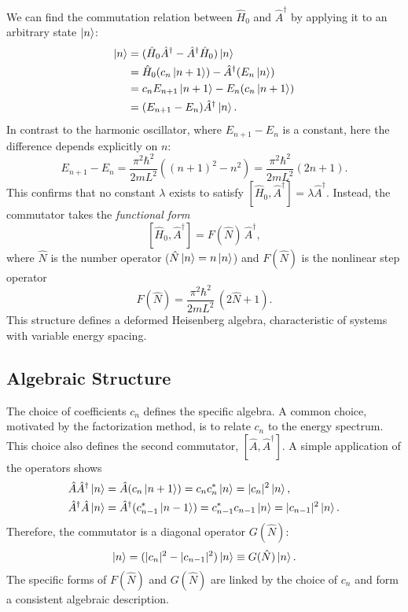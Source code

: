 We can find the commutation relation between $\hat{H}_0$ and
$\hat{A}^\dagger$ by applying it to an arbitrary state $\ket{n}$:
\begin{align}
  [\hat{H}_0, \hat{A}^\dagger] \ket{n}
    &= (\hat{H}_0 \hat{A}^\dagger - \hat{A}^\dagger \hat{H}_0) \ket{n}
      \nonumber \\
    &= \hat{H}_0 (c_n \ket{n+1}) - \hat{A}^\dagger (E_n \ket{n})
      \nonumber \\
    &= c_n E_{n+1} \ket{n+1} - E_n (c_n \ket{n+1}) \nonumber \\
    &= (E_{n+1} - E_n) \hat{A}^\dagger \ket{n}.
\end{align}
In contrast to the harmonic oscillator, where $E_{n+1} - E_n$ is a
constant, here the difference depends explicitly on $n$:
\begin{equation}
  E_{n+1} - E_n = \frac{\pi^2\hbar^2}{2mL^2} \left( (n+1)^2 - n^2 \right)
  = \frac{\pi^2\hbar^2}{2mL^2}(2n+1).
\end{equation}
This confirms that no constant $\lambda$ exists to satisfy
$[\hat{H}_0,\hat{A}^\dagger] = \lambda \hat{A}^\dagger$.
Instead, the commutator takes the \emph{functional form}
\begin{equation} \label{eq:deformed_comm_H}
  [\hat{H}_0,\hat{A}^\dagger] = F(\hat{N})\,\hat{A}^\dagger,
\end{equation}
where $\hat{N}$ is the number operator ($\hat{N}\ket{n} = n\ket{n}$)
and $F(\hat{N})$ is the nonlinear step operator
\begin{equation}
  F(\hat{N}) = \frac{\pi^2\hbar^2}{2mL^2}\,(2\hat{N}+1).
\end{equation}
This structure defines a deformed Heisenberg algebra,
characteristic of systems with variable energy spacing.

\subsection{Algebraic Structure}

The choice of coefficients $c_n$ defines the specific algebra.
A common choice, motivated by the factorization method,
is to relate $c_n$ to the energy spectrum.
This choice also defines the second commutator, $[\hat{A}, \hat{A}^\dagger]$.
A simple application of the operators shows
\begin{align}
  \hat{A}\hat{A}^\dagger \ket{n} &= \hat{A}(c_n \ket{n+1})
    = c_n c_n^* \ket{n} = |c_n|^2 \ket{n}, \\
  \hat{A}^\dagger\hat{A} \ket{n} &= \hat{A}^\dagger(c_{n-1}^* \ket{n-1})
    = c_{n-1}^* c_{n-1} \ket{n} = |c_{n-1}|^2 \ket{n}.
\end{align}
Therefore, the commutator is a diagonal operator $G(\hat{N})$:
\begin{equation}
  [\hat{A}, \hat{A}^\dagger] \ket{n} = (|c_n|^2 - |c_{n-1}|^2) \ket{n}
  \equiv G(\hat{N}) \ket{n}.
\end{equation}
The specific forms of $F(\hat{N})$ and $G(\hat{N})$ are linked by the
choice of $c_n$ and form a consistent algebraic description.


